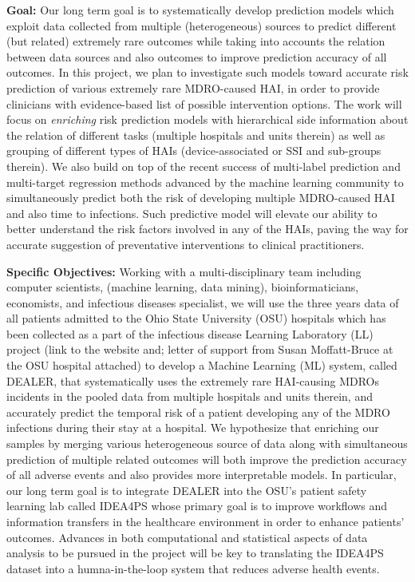 {\bf Goal:} Our long term goal is to systematically develop prediction models which exploit data collected from multiple (heterogeneous) sources to predict different (but related) extremely rare outcomes while taking into accounts the relation between data sources and also outcomes to improve prediction accuracy of all outcomes. In this project, we plan to investigate such models toward accurate risk prediction of various extremely rare MDRO-caused HAI, in order to provide clinicians with evidence-based list of possible intervention options. The work will focus on \emph{enriching} risk prediction models with hierarchical side information about the relation of different tasks (multiple hospitals and units therein) as well as grouping of different types of HAIs (device-associated or SSI and sub-groups therein). We also build on top of the recent success of multi-label prediction and multi-target regression methods advanced by the machine learning community to simultaneously predict both the risk of developing multiple MDRO-caused HAI and also time to infections. Such predictive model will elevate our ability to better understand the risk factors involved in any of the HAIs, paving the way for accurate suggestion of preventative interventions to clinical practitioners.  

{\bf Specific Objectives:} Working with a multi-disciplinary team including computer scientists, (machine learning, data mining), bioinformaticians, economists, and infectious diseases specialist, we will use the three years data of all patients admitted to the Ohio State University (OSU) hospitals which has been collected as a part of the infectious disease Learning Laboratory (LL) project ({\color{red}link to the website and; letter of support from Susan Moffatt-Bruce at the OSU hospital attached}) to develop a Machine Learning (ML) system, called DEALER, that systematically uses the extremely rare HAI-causing MDROs incidents in the pooled data from multiple hospitals and units therein, and accurately predict the temporal risk of a patient developing any of the MDRO infections during their stay at a hospital. We hypothesize that enriching our samples by merging various heterogeneous source of data along with simultaneous prediction of multiple related outcomes will both improve the prediction accuracy of all adverse events and also provides more interpretable models. In particular, our long term goal is to integrate DEALER into the OSU's patient safety learning lab called IDEA4PS whose primary goal is to improve workflows and information transfers in the healthcare environment in order to enhance patients' outcomes. Advances in both computational and statistical aspects of data analysis to be pursued in the project will be key to translating the IDEA4PS dataset into a humna-in-the-loop system that reduces adverse health events. 

